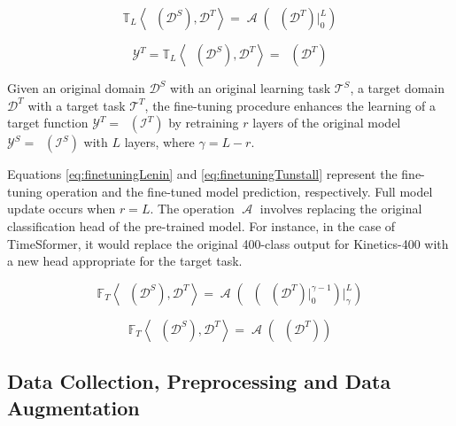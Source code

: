 \documentclass[runningheads]{llncs}
\DeclareMathOperator{\ypredtarget}{\phi^{T}}
\DeclareMathOperator{\ypredsource}{\phi^{S}}
\DeclareMathOperator{\ConvNetOut}{\mathcal{A}}
\begin{document}
\begin{equation}
  \mathbb{T}_{L} \left\langle \ypredsource(\mathcal{D}^{S}), \mathcal{D}^{T} \right\rangle = \ConvNetOut \left( \ypredsource(\mathcal{D}^{T}) \Bigr\rvert_{0}^{L} \right)
  \label{eq:Transfer2}
\end{equation}

\begin{equation}
  \mathcal{Y}^{T} = \mathbb{T}_{L} \left\langle \ypredsource(\mathcal{D}^{S}), \mathcal{D}^{T} \right\rangle = \ypredtarget(\mathcal{D}^{T})
  \label{eq:Transfer3}
\end{equation}

\begin{definition}
  Given an original domain $\mathcal{D}^{S}$ with an original learning task $\mathcal{T}^{S}$, a target domain $\mathcal{D}^{T}$ with a target task $\mathcal{T}^{T}$, the fine-tuning procedure enhances the learning of a target function $\mathcal{Y}^T = \ypredtarget(\mathcal{I}^T)$ by retraining $r$ layers of the original model $\mathcal{Y}^S = \ypredsource(\mathcal{I}^S)$ with $L$ layers, where $\gamma = L - r$.
\end{definition}

Equations \eqref{eq:finetuningLenin} and \eqref{eq:finetuningTunstall} represent the fine-tuning operation and the fine-tuned model prediction, respectively. Full model update occurs when $r = L$. The operation $\ConvNetOut$ involves replacing the original classification head of the pre-trained model. For instance, in the case of TimeSformer, it would replace the original 400-class output for Kinetics-400 with a new head appropriate for the target task.

\begin{equation}
  \mathbb{F}_{T} \left\langle \ypredsource(\mathcal{D}^{S}), \mathcal{D}^{T} \right\rangle = \ConvNetOut \left( \ypredsource \left( \ypredsource(\mathcal{D}^{T}) \Bigr\rvert_{0}^{\gamma - 1} \right) \Bigr\rvert_{\gamma}^{L} \right)
  \label{eq:finetuningLenin}
\end{equation}

\begin{equation}
  \mathbb{F}_{T} \left\langle \ypredsource(\mathcal{D}^{S}), \mathcal{D}^{T} \right\rangle = \ConvNetOut \left( \ypredsource(\mathcal{D}^{T}) \right)
  \label{eq:finetuningTunstall}
\end{equation}

\subsection{Data Collection, Preprocessing and Data Augmentation}
\label{sec:dataset}
\end{document}
